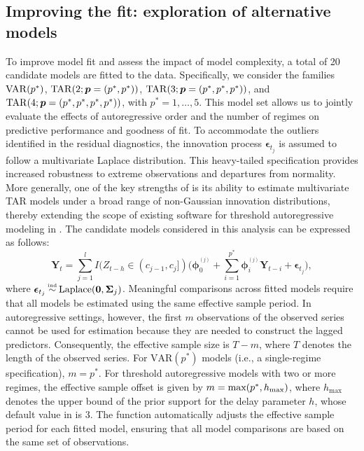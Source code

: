 \subsection{Improving the fit: exploration of alternative models}
To improve model fit and assess the impact of model complexity, a total of 20 candidate models are fitted to the data. Specifically, we consider the families ${\rm VAR}(p^*)$, ${\rm TAR}(2;\bm{p}=(p^*,p^*))$, ${\rm TAR}(3;\bm{p}=(p^*,p^*,p^*))$, and ${\rm TAR}(4;\bm{p}=(p^*,p^*,p^*,p^*))$, with $p^*=1,\ldots,5$. This model set allows us to jointly evaluate the effects of autoregressive order and the number of regimes on predictive performance and goodness of fit. To accommodate the outliers identified in the residual diagnostics, the innovation process $\bm{\epsilon}_{t_j}$ is assumed to follow a multivariate Laplace distribution. This heavy-tailed specification provides increased robustness to extreme observations and departures from normality. More generally, one of the key strengths of  is its ability to estimate multivariate TAR models under a broad range of non-Gaussian innovation distributions, thereby extending the scope of existing software for threshold autoregressive modeling in . The candidate models considered in this analysis can be expressed as follows:
$$\bm{Y}_t=\sum\limits_{j=1}^{l} I(Z_{t-h}\in(c_{j-1},c_j])\!\Big(\!\bm{\phi}_0^{^{(j)}}+\sum\limits_{i=1}^{p^*}\bm{\phi}_i^{^{(j)}}\bm{Y}_{t-i}+\bm{\epsilon}_{t_j}\!\Big),$$
where $\bm{\epsilon}_{t_j} \myeq \text{Laplace}(\bm{0},\bm{\Sigma}_j)$. 
Meaningful comparisons across fitted models require that all models be estimated using the same effective sample period. In autoregressive settings, however, the first $m$ observations of the observed series cannot be used for estimation because they are needed to construct the lagged predictors. Consequently, the effective sample size is $T-m$, where $T$ denotes the length of the observed series. For $\text{VAR}(p^*)$ models (i.e., a single-regime specification), $m=p^*$. For threshold autoregressive models with two or more regimes, the effective sample offset is given by $m = \text{max}(p^*, h_{\rm max})$, where $h_{\max}$ denotes the upper bound of the prior support for the delay parameter $h$, whose default value in  is 3. The  function automatically adjusts the effective sample period for each fitted model, ensuring that all model comparisons are based on the same set of observations.


